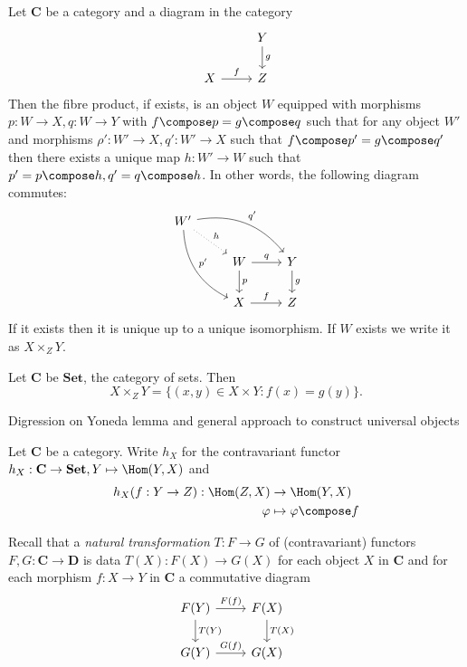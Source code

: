 \documentclass[a4paper]{article}
\renewcommand{\c}[1]{\mathbf{#1}} %
\begin{document}
Let \(\c C\) be a category and a diagram in the category
\[
  \begin{tikzcd}
    & Y \ar[d, "g"] \\
    X \ar[r, "f"] & Z
  \end{tikzcd}
\]
Then the fibre product, if exists, is an object \(W\) equipped with morphisms \(p: W \to X, q: W \to Y\) with \(f \compose p = g \compose q\) such that for any object \(W'\) and morphisms \(\rho': W' \to X, q': W' \to X\) such that \(f \compose p' = g \compose q'\) then there exists a unique map \(h: W' \to W\) such that \(p' = p \compose h, q' = q \compose h\). In other words, the following diagram commutes:
\[
  \begin{tikzcd}
    W' \ar[drr, "q'", bend left] \ar[ddr, "p'", bend right] \ar[dr, "h", dotted] \\
    & W \ar[r, "q"] \ar[d, "p"] & Y \ar[d, "g"] \\
    & X \ar[r, "f"] & Z
  \end{tikzcd}
\]
If it exists then it is unique up to a unique isomorphism. If \(W\) exists we write it as \(X \times_Z Y\).

\begin{eg}
  Let \(\c C\) be \(\c{Set}\), the category of sets. Then
  \[
    X \times_Z Y = \{(x, y) \in X \times Y: f(x) = g(y)\}.
  \]
\end{eg}

Digression on Yoneda lemma and general approach to construct universal objects

\begin{definition}
  Let \(\c C\) be a category. Write \(h_X\) for the contravariant functor \(h_X: \c C \to \c{Set}, Y \mapsto \Hom(Y, X)\) and
  \begin{align*}
    h_X(f: Y \to Z): \Hom(Z, X) &\to \Hom(Y, X) \\
    \varphi &\mapsto \varphi \compose f
  \end{align*}
\end{definition}

Recall that a \emph{natural transformation} \(T: F \to G\) of (contravariant) functors \(F, G: \c C \to \c D\) is data \(T(X): F(X) \to G(X)\) for each object \(X\) in \(\c C\) and for each morphism \(f: X \to Y\) in \(\c C\) a commutative diagram
\[
  \begin{tikzcd}
    F(Y) \ar[r, "F(f)"] \ar[d, "T(Y)"] & F(X) \ar[d, "T(X)"] \\
    G(Y) \ar[r, "G(f)"] & G(X)
  \end{tikzcd}
\]
\end{document}
